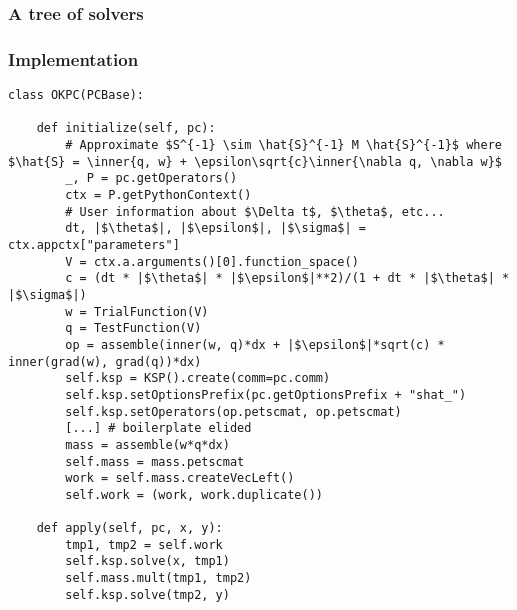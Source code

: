 \documentclass[presentation]{beamer}
\newcommand{\inner}[1]{\left\langle #1 \right \rangle}
\begin{document}
\begin{frame}
  \frametitle{A tree of solvers}
\end{frame}
\begin{frame}[fragile]
  \frametitle{Implementation}
\begin{verbatim}
class OKPC(PCBase):

    def initialize(self, pc):
        # Approximate $S^{-1} \sim \hat{S}^{-1} M \hat{S}^{-1}$ where $\hat{S} = \inner{q, w} + \epsilon\sqrt{c}\inner{\nabla q, \nabla w}$
        _, P = pc.getOperators()
        ctx = P.getPythonContext()
        # User information about $\Delta t$, $\theta$, etc...
        dt, |$\theta$|, |$\epsilon$|, |$\sigma$| = ctx.appctx["parameters"]
        V = ctx.a.arguments()[0].function_space()
        c = (dt * |$\theta$| * |$\epsilon$|**2)/(1 + dt * |$\theta$| * |$\sigma$|)
        w = TrialFunction(V)
        q = TestFunction(V)
        op = assemble(inner(w, q)*dx + |$\epsilon$|*sqrt(c) * inner(grad(w), grad(q))*dx)
        self.ksp = KSP().create(comm=pc.comm)
        self.ksp.setOptionsPrefix(pc.getOptionsPrefix + "shat_")
        self.ksp.setOperators(op.petscmat, op.petscmat)
        [...] # boilerplate elided
        mass = assemble(w*q*dx)
        self.mass = mass.petscmat
        work = self.mass.createVecLeft()
        self.work = (work, work.duplicate())

    def apply(self, pc, x, y):
        tmp1, tmp2 = self.work
        self.ksp.solve(x, tmp1)
        self.mass.mult(tmp1, tmp2)
        self.ksp.solve(tmp2, y)
\end{verbatim}
\end{frame}
\end{document}
